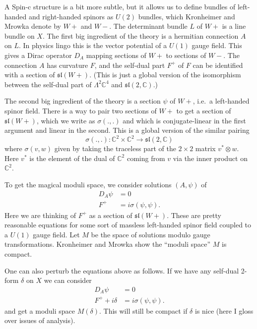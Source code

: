 \documentclass{article}
\begin{document}
A Spin-c structure is a bit more subtle, but it allows us to define
bundles of left-handed and right-handed spinors as \(U(2)\) bundles,
which Kronheimer and Mrowka denote by \(W+\) and \(W-\). The determinant
bundle \(L\) of \(W+\) is a line bundle on \(X\). The first big
ingredient of the theory is a hermitian connection \(A\) on \(L\). In
physics lingo this is the vector potential of a \(U(1)\) gauge field.
This gives a Dirac operator \(D_A\) mapping sections of \(W+\) to
sections of \(W-\). The connection \(A\) has curvature \(F\), and the
self-dual part \(F^+\) of \(F\) can be identified with a section of
\(\mathfrak{sl}(W+)\). (This is just a global version of the isomorphism
between the self-dual part of \(\Lambda^2 \mathbb{C}^4\) and
\(\mathfrak{sl}(2,\mathbb{C})\).)

The second big ingredient of the theory is a section \(\psi\) of \(W+\),
i.e.~a left-handed spinor field. There is a way to pair two sections of
\(W+\) to get a section of \(\mathfrak{sl}(W+)\), which we write as
\(\sigma(.,.)\) and which is conjugate-linear in the first argument and
linear in the second. This is a global version of the similar pairing
\[\sigma(.,.)\colon \mathbb{C}^2 \times \mathbb{C}^2 \to \mathfrak{sl}(2,\mathbb{C})\]
where \(\sigma(v,w)\) given by taking the traceless part of the
\(2\times2\) matrix \(v^* \otimes w\). Here \(v^*\) is the element of
the dual of \(\mathbb{C}^2\) coming from \(v\) via the inner product on
\(\mathbb{C}^2\).

To get the magical moduli space, we consider solutions \((A,\psi)\) of
\[\begin{aligned}D_A\psi &= 0 \\ F^+ &= i\sigma(\psi,\psi).\end{aligned}\]
Here we are thinking of \(F^+\) as a section of \(\mathfrak{sl}(W+)\).
These are pretty reasonable equations for some sort of massless
left-handed spinor field coupled to a \(U(1)\) gauge field. Let \(M\) be
the space of solutions modulo gauge transformations. Kronheimer and
Mrowka show the ``moduli space'' \(M\) is compact.

One can also perturb the equations above as follows. If we have any
self-dual 2-form \(\delta\) on \(X\) we can consider
\[\begin{aligned}D_A\psi &= 0 \\ F^+ +i\delta &= i\sigma(\psi,\psi).\end{aligned}\]
and get a moduli space \(M(\delta)\). This will still be compact if
\(\delta\) is nice (here I gloss over issues of analysis).
\end{document}
